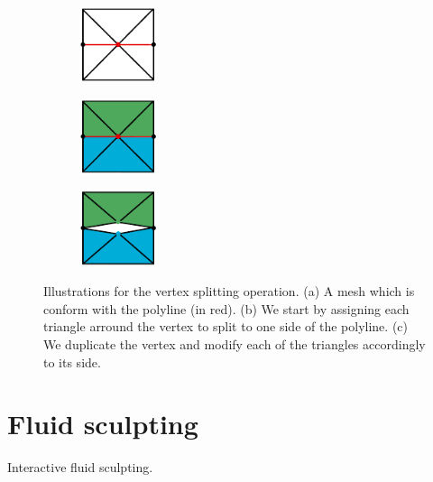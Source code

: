 \documentclass[11pt, oneside, a4paper]{memoir}
\begin{document}
\begin{figure}[p]
\centering
\begin{subfigure}[c]{0.3\linewidth}
\centering
\includegraphics[height=2.2cm]{images/cutting-mig2015/vertex_splitting_1.pdf}
\caption{\label{fig:vertexSplitting1}}
\end{subfigure}
\begin{subfigure}[c]{0.3\linewidth}
\centering
\includegraphics[height=2.2cm]{images/cutting-mig2015/vertex_splitting_2.pdf}
\caption{\label{fig:vertexSplitting2}}
\end{subfigure}
\begin{subfigure}[c]{0.3\linewidth}
\centering
\includegraphics[height=2.2cm]{images/cutting-mig2015/vertex_splitting_3.pdf}
\caption{\label{fig:vertexSplitting3}}
\end{subfigure}
\caption{\label{fig:vertexSplitting} Illustrations for the vertex splitting operation. (a) A mesh which is conform with the polyline (in red). (b) We start by assigning each triangle arround the vertex to split to one side of the polyline. (c) We duplicate the vertex and modify each of the triangles accordingly to its side.}
\end{figure}


















\chapter{Fluid sculpting}
\label{chap:fluidsculpting}
Interactive fluid sculpting.
\end{document}
